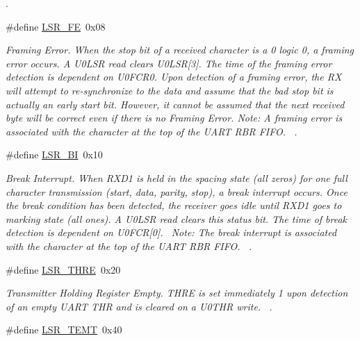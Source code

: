 \begin{DoxyCompactItemize}
\begin{DoxyCompactList}
. \end{DoxyCompactList}\item 
\#define \hyperlink{group___r_e_g_i_s_t_r_o___l_s_r_gae3f9ccc88c615d1257ad400cf27af7eb}{L\+S\+R\+\_\+\+FE}~0x08
\begin{DoxyCompactList}\small\item\em Framing Error. When the stop bit of a received character is a 0 logic 0, a framing error occurs. A U0\+L\+SR read clears U0\+L\+SR\mbox{[}3\mbox{]}. The time of the framing error detection is dependent on U0\+F\+C\+R0. Upon detection of a framing error, the RX will attempt to re-\/synchronize to the data and assume that the bad stop bit is actually an early start bit. However, it cannot be assumed that the next received byte will be correct even if there is no Framing Error. Note\+: A framing error is associated with the character at the top of the U\+A\+RT R\+BR F\+I\+FO.~\newline
. \end{DoxyCompactList}\item 
\#define \hyperlink{group___r_e_g_i_s_t_r_o___l_s_r_ga0fa2f414cac085b768774f2881321b60}{L\+S\+R\+\_\+\+BI}~0x10
\begin{DoxyCompactList}\small\item\em Break Interrupt. When R\+X\+D1 is held in the spacing state (all zeros) for one full character transmission (start, data, parity, stop), a break interrupt occurs. Once the break condition has been detected, the receiver goes idle until R\+X\+D1 goes to marking state (all ones). A U0\+L\+SR read clears this status bit. The time of break detection is dependent on U0\+F\+CR\mbox{[}0\mbox{]}.~ Note\+: The break interrupt is associated with the character at the top of the U\+A\+RT R\+BR F\+I\+FO.~\newline
. \end{DoxyCompactList}\item 
\#define \hyperlink{group___r_e_g_i_s_t_r_o___l_s_r_ga8c1a828f5fe296a9c1668cf3e72c00c1}{L\+S\+R\+\_\+\+T\+H\+RE}~0x20
\begin{DoxyCompactList}\small\item\em Transmitter Holding Register Empty. T\+H\+RE is set immediately 1 upon detection of an empty U\+A\+RT T\+HR and is cleared on a U0\+T\+HR write.~\newline
. \end{DoxyCompactList}\item 
\#define \hyperlink{group___r_e_g_i_s_t_r_o___l_s_r_ga7dfceb10f5c20011b9410e2efb39163d}{L\+S\+R\+\_\+\+T\+E\+MT}~0x40

\end{DoxyCompactItemize}
